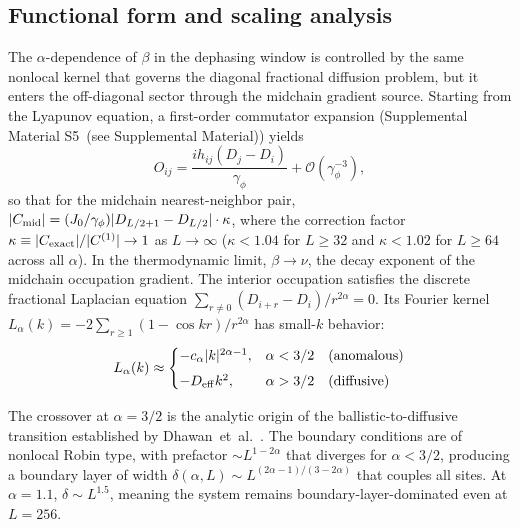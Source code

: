 \documentclass[aps,prb,twocolumn,superscriptaddress,floatfix]{revtex4-2}
\begin{document}
\subsection{Functional form and scaling analysis}
\label{sec:funcform}

The $\alpha$-dependence of $\beta$ in the dephasing window is controlled by the same nonlocal kernel that governs the diagonal fractional diffusion problem, but it enters the off-diagonal sector through the midchain gradient source. Starting from the Lyapunov equation, a first-order commutator expansion (Supplemental Material S5~(see Supplemental Material)) yields
\begin{equation}
O_{ij} = \frac{i h_{ij} (D_j - D_i)}{\gamma_\phi} + \mathcal{O}(\gamma_\phi^{-3}),
\label{eq:commutator}
\end{equation}
so that for the midchain nearest-neighbor pair, $|C_{\rm mid}| = (J_0 / \gamma_\phi) |D_{L/2+1} - D_{L/2}| \cdot \kappa$, where the correction factor $\kappa \equiv |C_{\rm exact}| / |C^{(1)}| \to 1$ as $L \to \infty$ ($\kappa < 1.04$ for $L \ge 32$ and $\kappa < 1.02$ for $L \ge 64$ across all $\alpha$). In the thermodynamic limit, $\beta \to \nu$, the decay exponent of the midchain occupation gradient. The interior occupation satisfies the discrete fractional Laplacian equation $\sum_{r \neq 0} (D_{i+r} - D_i) / r^{2\alpha} = 0$. Its Fourier kernel $L_\alpha(k) = -2\sum_{r \ge 1} (1 - \cos k r) / r^{2\alpha}$ has small-$k$ behavior:
\begin{equation}
L_\alpha(k) \approx
\begin{cases}
-c_\alpha |k|^{2\alpha - 1}, & \alpha < 3/2 \quad\text{(anomalous)} \\[4pt]
-D_{\rm eff} k^2, & \alpha > 3/2 \quad\text{(diffusive)}
\end{cases}
\label{eq:Lkernel}
\end{equation}

The crossover at $\alpha = 3/2$ is the analytic origin of the ballistic-to-diffusive transition established by Dhawan~et~al.~\cite{Dhawan2024}. The boundary conditions are of nonlocal Robin type, with prefactor $\sim L^{1-2\alpha}$ that diverges for $\alpha < 3/2$, producing a boundary layer of width $\delta(\alpha, L) \sim L^{(2\alpha-1)/(3-2\alpha)}$ that couples all sites. At $\alpha = 1.1$, $\delta \sim L^{1.5}$, meaning the system remains boundary-layer-dominated even at $L = 256$.
\end{document}
